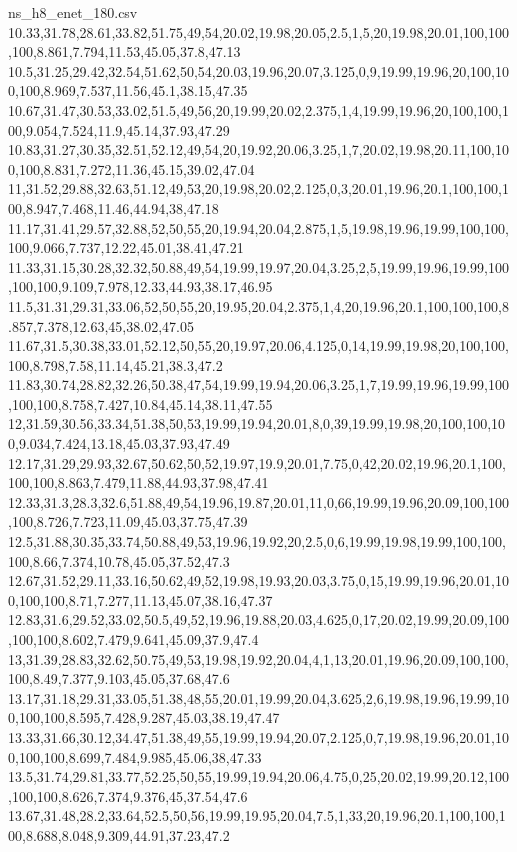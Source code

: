 \begin{filecontents*}[overwrite]{ns_h8_enet_180.csv}
10.33,31.78,28.61,33.82,51.75,49,54,20.02,19.98,20.05,2.5,1,5,20,19.98,20.01,100,100,100,8.861,7.794,11.53,45.05,37.8,47.13
10.5,31.25,29.42,32.54,51.62,50,54,20.03,19.96,20.07,3.125,0,9,19.99,19.96,20,100,100,100,8.969,7.537,11.56,45.1,38.15,47.35
10.67,31.47,30.53,33.02,51.5,49,56,20,19.99,20.02,2.375,1,4,19.99,19.96,20,100,100,100,9.054,7.524,11.9,45.14,37.93,47.29
10.83,31.27,30.35,32.51,52.12,49,54,20,19.92,20.06,3.25,1,7,20.02,19.98,20.11,100,100,100,8.831,7.272,11.36,45.15,39.02,47.04
11,31.52,29.88,32.63,51.12,49,53,20,19.98,20.02,2.125,0,3,20.01,19.96,20.1,100,100,100,8.947,7.468,11.46,44.94,38,47.18
11.17,31.41,29.57,32.88,52,50,55,20,19.94,20.04,2.875,1,5,19.98,19.96,19.99,100,100,100,9.066,7.737,12.22,45.01,38.41,47.21
11.33,31.15,30.28,32.32,50.88,49,54,19.99,19.97,20.04,3.25,2,5,19.99,19.96,19.99,100,100,100,9.109,7.978,12.33,44.93,38.17,46.95
11.5,31.31,29.31,33.06,52,50,55,20,19.95,20.04,2.375,1,4,20,19.96,20.1,100,100,100,8.857,7.378,12.63,45,38.02,47.05
11.67,31.5,30.38,33.01,52.12,50,55,20,19.97,20.06,4.125,0,14,19.99,19.98,20,100,100,100,8.798,7.58,11.14,45.21,38.3,47.2
11.83,30.74,28.82,32.26,50.38,47,54,19.99,19.94,20.06,3.25,1,7,19.99,19.96,19.99,100,100,100,8.758,7.427,10.84,45.14,38.11,47.55
12,31.59,30.56,33.34,51.38,50,53,19.99,19.94,20.01,8,0,39,19.99,19.98,20,100,100,100,9.034,7.424,13.18,45.03,37.93,47.49
12.17,31.29,29.93,32.67,50.62,50,52,19.97,19.9,20.01,7.75,0,42,20.02,19.96,20.1,100,100,100,8.863,7.479,11.88,44.93,37.98,47.41
12.33,31.3,28.3,32.6,51.88,49,54,19.96,19.87,20.01,11,0,66,19.99,19.96,20.09,100,100,100,8.726,7.723,11.09,45.03,37.75,47.39
12.5,31.88,30.35,33.74,50.88,49,53,19.96,19.92,20,2.5,0,6,19.99,19.98,19.99,100,100,100,8.66,7.374,10.78,45.05,37.52,47.3
12.67,31.52,29.11,33.16,50.62,49,52,19.98,19.93,20.03,3.75,0,15,19.99,19.96,20.01,100,100,100,8.71,7.277,11.13,45.07,38.16,47.37
12.83,31.6,29.52,33.02,50.5,49,52,19.96,19.88,20.03,4.625,0,17,20.02,19.99,20.09,100,100,100,8.602,7.479,9.641,45.09,37.9,47.4
13,31.39,28.83,32.62,50.75,49,53,19.98,19.92,20.04,4,1,13,20.01,19.96,20.09,100,100,100,8.49,7.377,9.103,45.05,37.68,47.6
13.17,31.18,29.31,33.05,51.38,48,55,20.01,19.99,20.04,3.625,2,6,19.98,19.96,19.99,100,100,100,8.595,7.428,9.287,45.03,38.19,47.47
13.33,31.66,30.12,34.47,51.38,49,55,19.99,19.94,20.07,2.125,0,7,19.98,19.96,20.01,100,100,100,8.699,7.484,9.985,45.06,38,47.33
13.5,31.74,29.81,33.77,52.25,50,55,19.99,19.94,20.06,4.75,0,25,20.02,19.99,20.12,100,100,100,8.626,7.374,9.376,45,37.54,47.6
13.67,31.48,28.2,33.64,52.5,50,56,19.99,19.95,20.04,7.5,1,33,20,19.96,20.1,100,100,100,8.688,8.048,9.309,44.91,37.23,47.2

\end{filecontents*}
